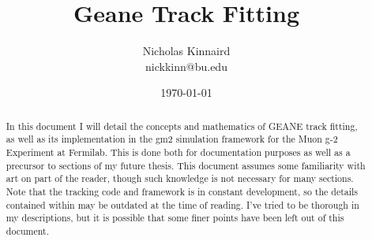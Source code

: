 \documentclass{article}
\begin{document}
\title{Geane Track Fitting}
\author{Nicholas Kinnaird \\ nickkinn@bu.edu}
\date{\today}
\maketitle

\begin{abstract}

    In this document I will detail the concepts and mathematics of GEANE track fitting, as well as its implementation in the gm2 simulation framework for the Muon g-2 Experiment at Fermilab. This is done both for documentation purposes as well as a precursor to sections of my future thesis. This document assumes some familiarity with art on part of the reader, though such knowledge is not necessary for many sections. Note that the tracking code and framework is in constant development, so the details contained within may be outdated at the time of reading. I've tried to be thorough in my descriptions, but it is possible that some finer points have been left out of this document.

\end{abstract}

\tableofcontents













% 







\newpage
\printbibliography



\end{document}
